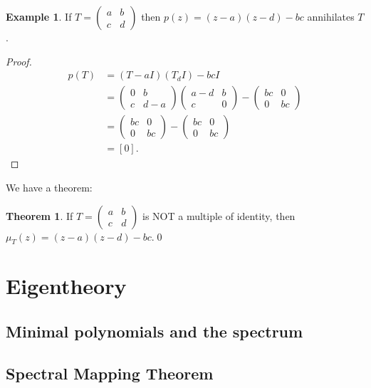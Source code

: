 \documentclass{article}
\theoremstyle{definition}
\newtheorem{exmp}{Example}[section]
\newtheorem{thm}{Theorem}[section]
\begin{document}
\begin{exmp}
	If $T = \begin{pmatrix}
	a&b\\c&d
	\end{pmatrix}$ then $p(z) = (z-a)(z-d) - bc$ annihilates $T$. 
	
	\begin{proof}
		\begin{align*}
		p(T) &= (T-aI)(T_dI) - bcI\\
		&= \begin{pmatrix}
		0 & b\\c & d-a
		\end{pmatrix}
		\begin{pmatrix}
		a-d&b\\c& 0
		\end{pmatrix}
		-
		\begin{pmatrix}
		bc & 0\\0 & bc
		\end{pmatrix}\\
		&=
		\begin{pmatrix}
		bc & 0\\0 & bc
		\end{pmatrix}
		-
		\begin{pmatrix}
		bc & 0\\0 & bc
		\end{pmatrix}\\
		&= [0].
		\end{align*}
	\end{proof}
\end{exmp}

We have a theorem:

\begin{thm}
	If $T = \begin{pmatrix}
	a&b\\c&d
	\end{pmatrix}$ is NOT a multiple of identity, then $\mu_T(z) = (z-a)(z-d) - bc$.\qed
\end{thm}


\newpage 
\section{Eigentheory}
\subsection{Minimal polynomials and the spectrum}
\subsection{Spectral Mapping Theorem}
\newpage 
\end{document}
